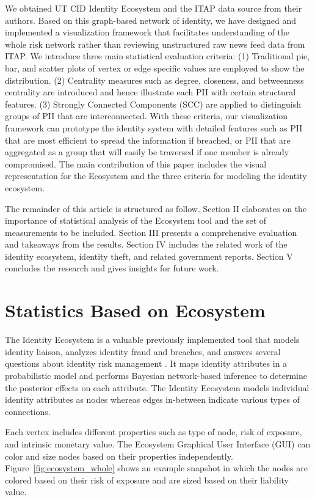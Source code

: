 \documentclass[conference]{IEEEtran}
\begin{document}
We obtained UT CID Identity Ecosystem and the ITAP data source from their authors. Based on this graph-based network of identity, we have designed and implemented a visualization framework that facilitates understanding of the whole risk network rather than reviewing unstructured raw news feed data from ITAP. We introduce three main statistical evaluation criteria: (1) Traditional pie, bar, and scatter plots of vertex or edge specific values are employed to show the distribution. (2) Centrality measures such as degree, closeness, and betweenness centrality are introduced and hence illustrate each PII with certain structural features. (3) Strongly Connected Components (SCC) are applied to distinguish groups of PII that are interconnected.  With these criteria, our visualization framework can prototype the identity system with detailed features such as PII that are most efficient to spread the information if breached, or PII that are aggregated as a group that will easily be traversed if one member is already compromised. The main contribution of this paper includes the visual representation for the Ecosystem and the three criteria for modeling the identity ecosystem.  

The remainder of this article is structured as follow. Section II elaborates on the importance of statistical analysis of the Ecosystem tool and the set of measurements to be included. Section III presents a comprehensive evaluation and takeaways from the results. Section IV includes the related work of the identity ecosystem, identity theft, and related government reports. Section V concludes the research and gives insights for future work.

\section{Statistics Based on Ecosystem}

The Identity Ecosystem is a valuable previously implemented tool that models identity liaison, analyzes identity fraud and breaches, and answers several questions about identity risk management \cite{EcosystemModeling}. It maps identity attributes in a probabilistic model and performs Bayesian network-based inference to determine the posterior effects on each attribute. The Identity Ecosystem models individual identity attributes as nodes whereas edges in-between indicate various types of connections.
 
Each vertex includes different properties such as type of node, risk of exposure, and intrinsic monetary value. The Ecosystem Graphical User Interface (GUI) can color and size nodes based on their properties independently. Figure~\ref{fig:ecosystem_whole} shows an example snapshot in which the nodes are colored based on their risk of exposure and are sized based on their liability value.
\end{document}
